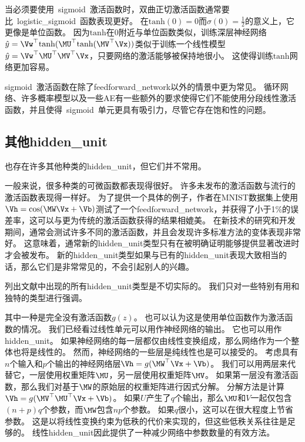 当必须要使用~\gls{sigmoid}~激活函数时，双曲正切激活函数通常要比~\gls{logistic_sigmoid}~函数表现更好。
在$\text{tanh}(0)=0$而$\sigma(0)=\frac{1}{2}$的意义上，它更像是单位函数。
因为$\text{tanh}$在0附近与单位函数类似，训练深层神经网络$\hat{y}=\Vw^\top \text{tanh}(\MU^\top \text{tanh}(\MV^\top \Vx))$类似于训练一个线性模型$\hat{y}= \Vw^\top \MU^\top \MV^\top \Vx$，只要网络的激活能够被保持地很小。
这使得训练$\text{tanh}$网络更加容易。


\gls{sigmoid}~激活函数在除了\gls{feedforward_network}以外的情景中更为常见。
循环网络、许多概率模型以及一些\gls{AE}有一些额外的要求使得它们不能使用分段线性激活函数，并且使得~\gls{sigmoid}~单元更具有吸引力，尽管它存在饱和性的问题。

\subsection{其他\gls{hidden_unit}}
\label{sec:other_hidden_units}

也存在许多其他种类的\gls{hidden_unit}，但它们并不常用。

一般来说，很多种类的可微函数都表现得很好。
许多未发布的激活函数与流行的激活函数表现得一样好。
为了提供一个具体的例子，作者在MNIST数据集上使用$\Vh=\cos(\MW\Vx+\Vb)$测试了一个\gls{feedforward_network}，并获得了小于1\%的误差率，这可以与更为传统的激活函数获得的结果相媲美。
在新技术的研究和开发期间，通常会测试许多不同的激活函数，并且会发现许多标准方法的变体表现非常好。
这意味着，通常新的\gls{hidden_unit}类型只有在被明确证明能够提供显著改进时才会被发布。
新的\gls{hidden_unit}类型如果与已有的\gls{hidden_unit}表现大致相当的话，那么它们是非常常见的，不会引起别人的兴趣。

列出文献中出现的所有\gls{hidden_unit}类型是不切实际的。
我们只对一些特别有用和独特的类型进行强调。

其中一种是完全没有激活函数$g(z)$。
也可以认为这是使用单位函数作为激活函数的情况。
我们已经看过线性单元可以用作神经网络的输出。
它也可以用作\gls{hidden_unit}。
如果神经网络的每一层都仅由线性变换组成，那么网络作为一个整体也将是线性的。
然而，神经网络的一些层是纯线性也是可以接受的。
考虑具有$n$个输入和$p$个输出的神经网络层$\Vh=g(\MW^\top \Vx+\Vb)$。
我们可以用两层来代替它，一层使用权重矩阵$\MU$，另一层使用权重矩阵$\MV$。
如果第一层没有激活函数，那么我们对基于$\MW$的原始层的权重矩阵进行因式分解。
分解方法是计算$\Vh=g(\MV^\top \MU^\top \Vx+\Vb)$。
如果$U$产生了$q$个输出，那么$\MU$和$V$一起仅包含$(n+p)q$个参数，而$\MW$包含$np$个参数。
如果$q$很小，这可以在很大程度上节省参数。
这是以将线性变换约束为低秩的代价来实现的，但这些低秩关系往往是足够的。
线性\gls{hidden_unit}因此提供了一种减少网络中参数数量的有效方法。

